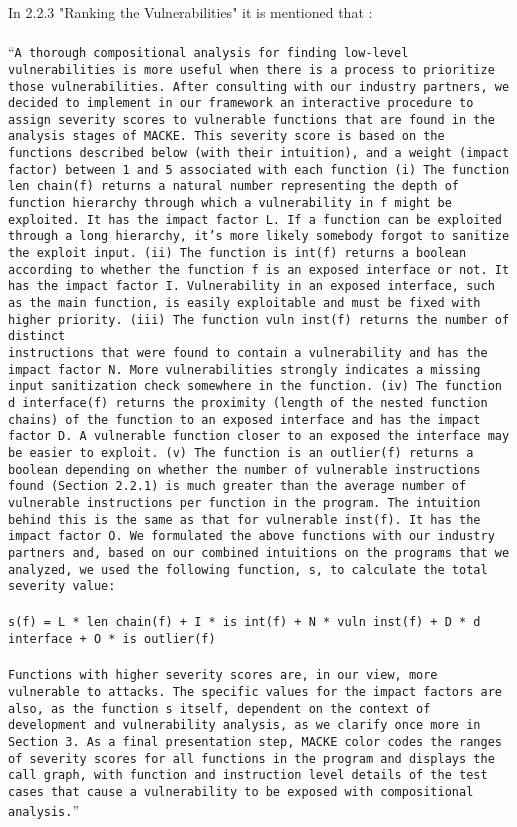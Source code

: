 In \parencite{ognawala} 2.2.3 "Ranking the Vulnerabilities" it is mentioned that :
\\\\
\enquote{\texttt{A thorough compositional analysis for finding low-level
		vulnerabilities is more useful when there is a process to
		prioritize those vulnerabilities. After consulting with our
		industry partners, we decided to implement in our framework
		an interactive procedure to assign severity scores to
		vulnerable functions that are found in the analysis stages
		of MACKE. This severity score is based on the functions
		described below (with their intuition), and a weight (impact
		factor) between 1 and 5 associated with each function (i) The function len chain(f) returns a natural number representing
		the depth of function hierarchy through which a
		vulnerability in f might be exploited. It has the impact factor
		L. If a function can be exploited through a long hierarchy,
		it’s more likely somebody forgot to sanitize the exploit input.
		(ii) The function is int(f) returns a boolean according to
		whether the function f is an exposed interface or not. It has
		the impact factor I. Vulnerability in an exposed interface,
		such as the main function, is easily exploitable and must
		be fixed with higher priority. (iii) The function vuln inst(f)
		returns the number of distinct \\ instructions that were found
		to contain a vulnerability and has the impact factor N. More
		vulnerabilities strongly indicates a missing input sanitization
		check somewhere in the function. (iv) The function
		d interface(f) returns the proximity (length of the nested function
		chains) of the function to an exposed interface and has
		the impact factor D. A vulnerable function closer to an exposed
		the interface may be easier to exploit. (v) The function
		is an outlier(f) returns a boolean depending on whether the
		number of vulnerable instructions found (Section 2.2.1) is
		much greater than the average number of vulnerable instructions
		per function in the program. The intuition behind this
		is the same as that for vulnerable inst(f). It has the impact
		factor O.
		We formulated the above functions with our industry partners
		and, based on our combined intuitions on the programs
		that we analyzed, we used the following function, s, to calculate
		the total severity value:
		\\\\
		s(f) = L * len chain(f) + I * is int(f) + N * vuln inst(f)
		+ D * d interface + O * is outlier(f)
		\\\\
		Functions with higher severity scores are, in our view, more
		vulnerable to attacks. The specific values for the impact
		factors are also, as the function s itself, dependent on the
		context of development and vulnerability analysis, as we
		clarify once more in Section 3.
		As a final presentation step, MACKE color codes the
		ranges of severity scores for all functions in the program
		and displays the call graph, with function and instruction
		level details of the test cases that cause a vulnerability to be exposed with compositional \\analysis.}}
